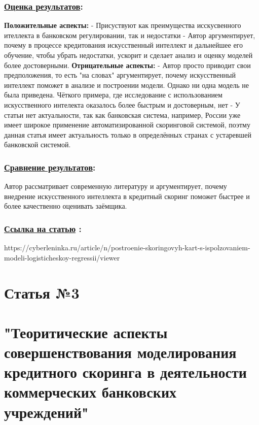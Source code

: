 \documentclass[a4paper,14pt]{article}
\begin{document}
\subsubsection*{\underline{Оценка результатов}:}
\textbf{Положительные аспекты:} \newline
- Присуствуют как преимущества исскусвенного ителлекта в банковском регулировании, так и недостатки \newline
- Автор аргументирует, почему в процессе кредитования искусственный  интеллект и дальнейшее его обучение, чтобы убрать недостатки, ускорит и сделает анализ и оценку моделей более достоверными. \newline 
\textbf{Отрицательные аспекты:} \newline
- Автор просто приводит свои предположения, то есть "на словах" аргументирует, почему искусственный интеллект поможет в анализе и построении модели. Однако ни одна модель не была приведена. Чёткого примера, где исследование с использованием искусственного интелекта оказалось более быстрым и достоверным, нет \newline
- У статьи нет актуальности, так как банковская система, например, России уже имеет широкое применение автоматизированной скоринговой системой, поэтму данная статья имеет актуальность только в определённых странах с устаревшей банковской системой.  \newline

\subsubsection*{\underline{Сравнение результатов}:}
Автор рассматривает современную литературу и аргументирует, почему внедрение искусственного интеллекта в кредитный скоринг поможет быстрее и более качественно оценивать заёмщика.

\subsubsection*{\underline{Ссылка на статью} :}
https://cyberleninka.ru/article/n/postroenie-skoringovyh-kart-s-ispolzovaniem-modeli-logisticheskoy-regressii/viewer


\newpage

\section*{Статья №3}
\section*{"Теоритические аспекты совершенствования моделирования кредитного скоринга в деятельности коммерческих банковских учреждений"}
\end{document}
